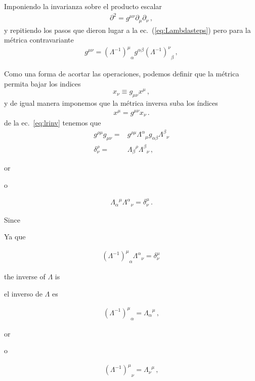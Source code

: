 \begin{frame}
Imponiendo la invarianza sobre el producto escalar
\begin{align}
  \partial^2=g^{\mu\nu}\partial_{\mu} \partial_{\nu}\,,
\end{align}
y repitiendo los pasos que dieron lugar a la ec.~(\ref{eq:Lambdasteps})
pero para la métrica contravariante
\begin{align}
g^{\mu\nu}= {\left(\Lambda^{-1}\right)^\mu}_\alpha g^{\alpha \beta}{\left(\Lambda^{-1}\right)^\nu}_\beta\,, 
\end{align}

Como una forma de acortar las operaciones, podemos definir que la métrica permita bajar los indices
\begin{equation}
\label{eq:149}
  x_\nu\equiv g_{\mu\nu}x^\mu\,,
\end{equation}
y de igual manera imponemos que la  métrica inversa suba  los índices
\begin{align}
  x^{\mu}=g^{\mu\nu}x_{\nu}\,.
\end{align}
de la ec.~\eqref{eq:lrinv} tenemos que
\begin{align}
  g^{\rho\mu}g_{\mu\nu}=&g^{\rho\mu}{\Lambda^\alpha}_{\mu}g_{\alpha\beta}{\Lambda^\beta}_{\nu}\nonumber\\
  \delta^\rho_\nu=&{\Lambda_\beta}^\rho{\Lambda^\beta}_{\nu}\,,
\end{align}
\begin{english}
or  
\end{english}
\begin{spanish}
o
\end{spanish}
\begin{align}
  {\Lambda_\alpha}^\mu{\Lambda^\alpha}_{\nu}=\delta^\mu_\nu\,.
\end{align}
\begin{english}
Since
\end{english}
\begin{spanish}
Ya que
\end{spanish}
\begin{align}
  {\left(\Lambda^{-1}\right)^\mu}_\alpha{\Lambda^\alpha}_{\nu}=\delta^\mu_\nu\,
\end{align}
\begin{english}
the inverse of $\Lambda$ is
\end{english}
\begin{spanish}
el inverso de $\Lambda$ es
\end{spanish}
\begin{align}
  {\left(\Lambda^{-1}\right)^\mu}_\alpha={\Lambda_\alpha}^\mu\,,
\end{align}
\begin{english}
or  
\end{english}
\begin{spanish}
o
\end{spanish}
\begin{align}
\label{eq:lambdainv}
  {\left(\Lambda^{-1}\right)^\mu}_\nu={\Lambda_\nu}^\mu\,,
\end{align}


\end{frame}
